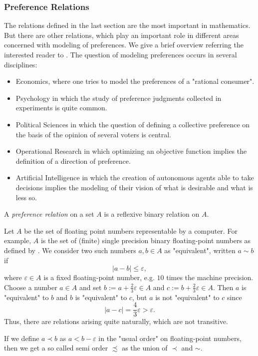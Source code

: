 ﻿\documentclass[a4paper,11pt,twoside,final]{article}
\numberwithin{equation}{subsection}
\begin{document}
\subsubsection{Preference Relations}
The relations defined in the last section are the most important in mathematics. But there are other relations, which play an important role in different areas concerned with modeling of preferences. We give a brief overview referring the interested reader to \cite{pref}. The question of modeling preferences occurs in several disciplines:
\begin{itemize}
\item Economics, where one tries to model the preferences of a "rational consumer".
\item Psychology in which the study of preference judgments collected in experiments is quite common.
\item Political Sciences in which the question of defining a collective preference on the basis of the opinion of several voters is central.
\item Operational Research in which optimizing an objective function implies the definition of a direction of preference.
\item Artificial Intelligence in which the creation of autonomous agents able to take decisions implies the modeling of their vision of what is desirable and what is less so.
\end{itemize}

\begin{defi}
A \emph{preference relation} on a set $A$ is a reflexive binary relation on $A$.
\end{defi}

\begin{exam}
Let $A$ be the set of floating point numbers representable by a computer. For example, $A$ is the set of (finite) single precision binary floating-point numbers as defined by \cite{ieee754}. We consider two such numbers $a,b\in A$ as "equivalent", written $a\sim b$ if
\begin{equation*}
\bigl|a-b\bigr|\le \varepsilon,
\end{equation*}
where $\varepsilon\in A$ is a fixed floating-point number, e.g. $10$ times the machine precision. Choose a number $a\in A$ and set $b:= a + \tfrac{2}{3}\varepsilon\in A$ and $c:= b + \tfrac{2}{3}\varepsilon\in A$. Then $a$ is "equivalent" to $b$ and $b$ is "equivalent" to $c$, but $a$ is not "equivalent" to $c$ since
\begin{equation*}
\bigl|a-c\bigr|= \dfrac{4}{3}\varepsilon>\varepsilon.
\end{equation*}
Thus, there are relations arising quite naturally, which are not transitive.\par
If we define $a\prec b$ as $a < b - \varepsilon$ in the "usual order" on floating-point numbers, then we get a so called semi order $\precsim$ as the union of $\prec$ and $\sim$.
\end{exam}
\end{document}
